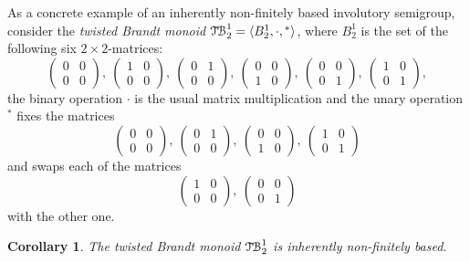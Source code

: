 \documentclass[11pt,reqno]{amsart}
\numberwithin{equation}{section}
\newtheorem{Cor}[Thm]{Corollary}
\theoremstyle{remark}
\def\fb{finitely based}
\def\TB{\ensuremath{\mathcal{T\kern-1pt B}_2^1}}
\begin{document}
As a concrete example of an inherently non-finitely based
involutory semigroup, consider the \emph{twisted Brandt monoid}
$\TB=\langle B_2^1,\cdot,{}^*\rangle$, where $B_2^1$ is the set of
the following six $2\times 2$-matrices:
$$\begin{pmatrix} 0 & 0\\ 0 & 0\end{pmatrix},\
\begin{pmatrix} 1 & 0\\ 0 & 0\end{pmatrix},\
\begin{pmatrix} 0 & 1\\ 0 & 0\end{pmatrix},\
\begin{pmatrix} 0 & 0\\ 1 & 0\end{pmatrix},\
\begin{pmatrix} 0 & 0\\ 0 & 1\end{pmatrix},\
\begin{pmatrix} 1 & 0\\ 0 & 1\end{pmatrix},$$
the binary operation $\cdot$ is the usual matrix multiplication
and the unary operation ${}^*$ fixes the matrices
$$\begin{pmatrix} 0 & 0\\ 0 & 0\end{pmatrix},\
\begin{pmatrix} 0 & 1\\ 0 & 0\end{pmatrix},\
\begin{pmatrix} 0 & 0\\ 1 & 0\end{pmatrix},\
\begin{pmatrix} 1 & 0\\ 0 & 1\end{pmatrix}$$
and swaps each of the matrices
$$\begin{pmatrix} 1 & 0\\ 0 & 0\end{pmatrix},\
\begin{pmatrix} 0 & 0\\ 0 & 1\end{pmatrix}$$
with the other one.

\begin{Cor}
\label{twisted Brandt} The twisted Brandt monoid $\TB$ is
inherently non-\fb.
\end{Cor}
\end{document}
